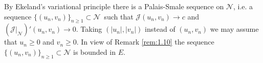 \documentclass{scrartcl}
\newcommand{\cJ}{{\mathcal J}}
\newcommand{\cN}{{\mathcal N}}
\newcommand{\weakto}{\rightharpoonup}
\numberwithin{equation}{section}
\begin{document}
By Ekeland's variational principle there is a Palais-Smale sequence on $\cN$, i.e. a sequence $\{(u_n,v_n)\}_{n \geq 1}\subset\cN$~such that $\cJ(u_n, v_n) \to c$ and $\left( \cJ \Big|_\cN \right)' (u_n, v_n) \to 0$. Taking $(|u_n|, |v_n|)$ instead of $(u_n, v_n)$ we may assume that $u_n \geq 0$ and $v_n \geq 0$. In view of Remark \ref{rem:1.10} the sequence $\{ (u_n, v_n) \}_{n \geq 1} \subset \cN$ is bounded in $E$. %
\end{document}
